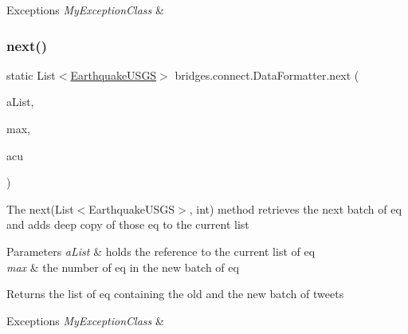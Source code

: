 \begin{DoxyExceptions}{Exceptions}
{\em My\+Exception\+Class} & \\
\hline
\end{DoxyExceptions}
\hypertarget{classbridges_1_1connect_1_1_data_formatter_ad451dd96b927702127d383e85fc98661}{}\label{classbridges_1_1connect_1_1_data_formatter_ad451dd96b927702127d383e85fc98661} 
\subsubsection{\texorpdfstring{next()}{next()}\hspace{0.1cm}{\footnotesize\ttfamily [2/2]}}
{\footnotesize\ttfamily static List$<$\hyperlink{classbridges_1_1data__src__dependent_1_1_earthquake_u_s_g_s}{Earthquake\+U\+S\+GS}$>$ bridges.\+connect.\+Data\+Formatter.\+next (\begin{DoxyParamCaption}\item[{List$<$ \hyperlink{classbridges_1_1data__src__dependent_1_1_earthquake_u_s_g_s}{Earthquake\+U\+S\+GS} $>$}]{a\+List,  }\item[{int}]{max,  }\item[{\hyperlink{classbridges_1_1data__src__dependent_1_1_u_s_g_saccount}{U\+S\+G\+Saccount}}]{acu }\end{DoxyParamCaption})\hspace{0.3cm}{\ttfamily [static]}}

The next(\+List$<$\+Earthquake\+U\+S\+G\+S$>$, int) method retrieves the next batch of eq and adds deep copy of those eq to the current list 
\begin{DoxyParams}{Parameters}
{\em a\+List} & holds the reference to the current list of eq \\
\hline
{\em max} & the number of eq in the new batch of eq \\
\hline
\end{DoxyParams}
\begin{DoxyReturn}{Returns}
the list of eq containing the old and the new batch of tweets 
\end{DoxyReturn}

\begin{DoxyExceptions}{Exceptions}
{\em My\+Exception\+Class} & \\
\hline
\end{DoxyExceptions}
\hypertarget{classbridges_1_1connect_1_1_data_formatter_af9b878e5c092234a6ab5f8c11bee1fbd}{}\label{classbridges_1_1connect_1_1_data_formatter_af9b878e5c092234a6ab5f8c11bee1fbd} 
